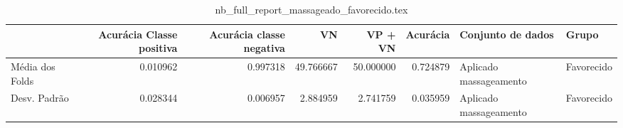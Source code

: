 \begin{table}
\centering
\caption{nb_full_report_massageado_favorecido.tex}
\label{nb_full_report_massageado_favorecido.tex}
\begin{tabular}{lrrrrrll}
\toprule
{} &  Acurácia Classe positiva &  Acurácia classe negativa &        VN  &   VP + VN  &  Acurácia &       Conjunto de dados &       Grupo \\
\midrule
Média dos Folds &                  0.010962 &                  0.997318 &  49.766667 &  50.000000 &  0.724879 &  Aplicado massageamento &  Favorecido \\
Desv. Padrão    &                  0.028344 &                  0.006957 &   2.884959 &   2.741759 &  0.035959 &  Aplicado massageamento &  Favorecido \\
\bottomrule
\end{tabular}
\end{table}
